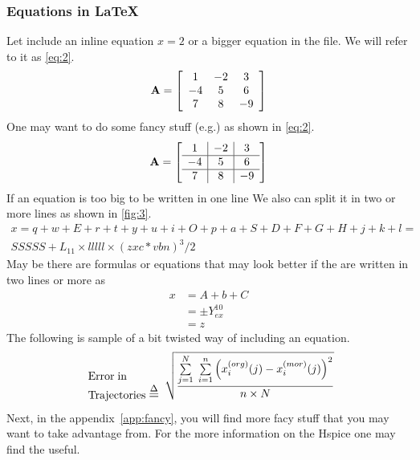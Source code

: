 \documentclass[12pt,oneside]{article}
\begin{document}
\subsubsection{Equations in \LaTeX}
%
Let include an inline equation $x=2$ or a bigger equation in the file. We will refer to it as \eqref{eq:2}.
%
%
\begin{equation}
\label{eq:1}
\mathbf{A}=\left[
\begin{array}{ccc}
 1 &-2 & 3 \\
-4 & 5 & 6 \\
 7 & 8 &-9
\end{array} 
\right]
\end{equation}
%
%
One may want to do some fancy stuff (e.g.) as shown in \eqref{eq:2}.
%
%
\begin{equation}
\label{eq:2}
\mathbf{A}=\left[
\begin{array}{c|c|c}
 1 &-2 & 3 \\
\hline
-4 & 5 & 6 \\
\hline
 7 & 8 &-9
\end{array} 
\right]
\end{equation}
%
%
If an equation is too big to be written in one line We also can split it in two or more lines as shown in \eqref{fig:3}.
%
%
\begin{multline}
\label{eq:3}
x=q+w+E+r+t+y+u+i+O+p+a+S+D+F+G+H+j+k+l= \\
SSSSS+L_{11}\times lllll\times (zxc*vbn)^3/2
\end{multline}
%
%
May be there are formulas or equations that may look better if the are written in two lines or more as 
%
%
\begin{align}
\label{eq:4}
x &= A+b+C \nonumber  \\
  &= \pm Y^{10}_{ex}  \\
	&= z
\end{align}
%
%
The following is sample of a bit twisted way of including an equation.
\begin{equation} \label{eq:10}
\begin{array}{*{20}{c}}
\begin{array}{l}
\textnormal{Error\;in}\\
\textnormal{Trajectories}\;\mlii{\buildrel \Delta \over =}
\end{array}
\sqrt{\dfrac{\sum\limits_{j = 1}^N \; \sum\limits_{i = 1}^n {\left( {x_i^{(org)}(j)-x_i^{(mor)}(j)} \right)}^2}{n \times N}}
\end{array}
\end{equation}
%
%
Next, in the \mbox{appendix~\ref{app:fancy}}, you will find more facy stuff that you may want to take advantage from. For the more information on the \mbox{Hspice\textsup{\textregistered}} \cite{hspice2013} one may find the \cite{hspice_qr2005} useful.
%
%
\end{document}

